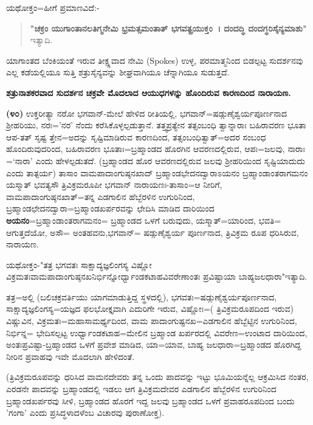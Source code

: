 ಯಥೋಕ್ತಂ=ಹೀಗೆ ಪ್ರಮಾಣವಿದೆ:-

\begin{verse}
\textbf{"ಚಕ್ರಂ ಯುಗಾಂತಾನಲತಿಗ್ಮನೇಮಿ ಭ್ರಮತ್ಸಮಂತಾತ್ ಭಗವತ್ಪ್ರಯುಕ್ತಂ~। ದಂದದ್ಧಿ ದಂದಗ್ಧರಿಸೈನ್ಯಮಾಶು"} ಇತ್ಯಾದಿ.
\end{verse}

\noindent
ಯಾಗಾಂತದ ಬೆಂಕಿಯಂತೆ ಇರುವ ತೀಕ್ಷ್ಣವಾದ ನೇಮಿ (Spokes) ಉಳ್ಳ, ಪರಮಾತ್ಮನಿಂದ ಬಿಡಲ್ಪಟ್ಟ ಸುದರ್ಶನವು ಎಲ್ಲ ಕಡೆಯಲ್ಲಿಯೂ ಸುತ್ತಿ ಶತ್ರುಸೈನ್ಯವನ್ನು ಶೀಘ್ರವಾಗಿಯೂ ಚೆನ್ನಾಗಿಯೂ ಸುಡುತ್ತದೆ.

\begin{center}
\textbf{ಶತ್ರುನಾಶಕರವಾದ ಸುದರ್ಶನ ಚಕ್ರವೇ ಮೊದಲಾದ ಆಯುಧಗಳನ್ನು ಹೊಂದಿರುವ ಕಾರಣದಿಂದ ನಾರಾಯಣ.}
\end{center}

\textbf{(೪೦)} ಉಕ್ತರೀತ್ಯಾ ನರೋ ಭಗವಾನ್-ಮೇಲೆ ಹೇಳಿದ ರೀತಿಯಲ್ಲಿ, ಭಗವಾನ್=\-ಷಡ್ಗುಣೈಶ್ವರ್ಯಪೂರ್ಣನಾದ ಶ‍್ರೀಹರಿಯು, ನರಃ='ನರ' ನೆಂದು ಕರೆಸಿಕೊಳ್ಳಲ್ಪಡುತ್ತಾನೆ. ತತ್ತ್ವಪ್ರತ್ಯೇನ ತತ್ಸಂಬಂಧಿ ತ್ವಾನ್ನಾರಾಃ ಬಹಿರಾವರಣ ಭೂತಾ ಆಪ-ತತ್ ಸೃಷ್ಟ ತ್ತೇನ=ಅದನ್ನು ಸೃಷ್ಟಿಮಾಡಿರುವ ಕಾರಣದಿಂದ, ತತ್ಸಂಬಂಧಿತ್ವಾತ್=ಅದರ ಸಂಬಂಧ ಹೊಂದಿರುವುದರಿಂದ, ಬಹಿರಾವರಣ ಭೂತಾಃ=ಬ್ರಹ್ಮಾಂಡದ ಹೊರಗಿನ ಆವರಣದಲ್ಲಿರುವ, ಆಪಃ=ಜಲವು, ನಾರಾಃ =`ನಾರಾ' ಎಂದು ಹೇಳಲ್ಪಡುತದೆ. (ಬ್ರಹ್ಮಾಂಡದ ಹೊರ ಆವರಣದಲ್ಲಿರುವ ಜಲವು ಶ‍್ರೀಹರಿಯಿಂದ ಸೃಷ್ಟಿಯಾದುದು ಎಂದು ತಾತ್ಪರ್ಯ) ತಾಸಾಂ ವಾಮಪಾದಾಂಗುಷ್ಠನಖಾದ್ ಬ್ರಹ್ಮಾಂಡಭೇದನದ್ವಾರಾಽಯನಂ ಬ್ರಹ್ಮಾಂಡಾಂತರಾಗಮನಂ ಯಸ್ಮಾತ್ ಭವತ್ಯಸೌ ತ್ರಿವಿಕ್ರಮರೂಪೀ ಭಗವಾನ್ ನಾರಾಯಣಃ-ತಾಸಾಂ=ಆ ನೀರಿಗೆ, ವಾಮಪಾದಾಂಗುಷ್ಠನಖಾತ್=ತನ್ನ ಎಡಗಾಲಿನ ಹೆಬ್ಬೆರಳಿನ ಉಗುರಿನಿಂದ, ಬ್ರಹ್ಮಾಂಡಛೇದನದ್ವಾರಾ=ಬ್ರಹ್ಮಾಂಡಖರ್ಪರವನ್ನು ಛೇದಿಸಿ ಮಾಡಿದ ದಾರಿಯಿಂದ \textbf{ಅಯನಂ}=ಬ್ರಹ್ಮಾಂಡಾಂತರಾಗಮನಂ= ಬ್ರಹ್ಮಾಂಡದ ಒಳಗೆ ಬರುವುದು, ಯಸ್ಮಾತ್=ಯಾರಿಂದ, ಭವತಿ= ಆಗುತ್ತದೆಯೋ, ಅಸೌ= ಅಂತಹವನು,\break ಭಗವಾನ್= ಷಡ್ಗುಣೈಶ್ವರ್ಯ ಪೂರ್ಣನಾದ, ತ್ರಿವಿಕ್ರಮ ರೂಪ ಧರಿಸಿರುವ, ನಾರಾಯಣ.

ಯಥೋಕ್ತಂ-"ತತ್ರ ಭಗವತಃ ಸಾಕ್ಷಾದ್ಯಜ್ಞಲಿಂಗಸ್ಯ ವಿಷ್ಣೋ ವಿಕ್ರಮತಃವಾಮಪಾದಾಂ\-ಗುಷ್ಠನಖನಿರ್ಭಿನ್ನೋರ್ಧ್ವಾಂಡಕಟಾಹವಿವರೇಣಾಂತಃ ಪ್ರವಿಷ್ಟಾಯಾ ಬಾಹ್ಯಜಲಧಾರಾ"\break ಇತ್ಯಾದಿ.

ತತ್ರ=ಅಲ್ಲಿ (ಬಲಿಚಕ್ರವರ್ತಿಯು ಯಾಗಮಾಡುತ್ತಿದ್ದ ಸ್ಥಳದಲ್ಲಿ), ಭಗವತಃ=ಷಡ್ಗುಣೈ\-ಶ್ವರ್ಯಪೂರ್ಣನಾದ, ಸಾಕ್ಷಾದ್ಯಜ್ಞಲಿಂಗಸ್ಯ=ಯಜ್ಞದ ಫಲಭೋಕ್ತೃವಾಗಿ ಎದುರಿಗೇ ಇರುವ, ವಿಷ್ಣೋಃ=( ತ್ರಿವಿಕ್ರಮರೂಪದಿಂದ ಇರುವ) ವಿಷ್ಣುವಿನ, ವಿಕ್ರಮತಃ=ಮಹಾಸಾಮರ್ಥ್ಯದಿಂದ, ವಾಮ ಪಾದಾಂಗುಷ್ಟನಖ=ಎಡಗಾಲಿನ ಹೆಬ್ಬೆಟ್ಟಿನ ಉಗುರಿನಿಂದ, ನಿರ್ಭಿನ್ನ= ಭೇದಿಸಲ್ಪಟ್ಟ ಉರ್ಧ್ವಾಂಡಕಟಾಹ=ಮೇಲಿನ ಬ್ರಹ್ಮಾಂಡ ಖರ್ಪರದಲ್ಲಿ ವಿವರೇಣ=ಉಂಟಾದ ದಾರಿಯಿಂದ, ಅಂತಃಪ್ರವಿಷ್ಟಾ-ಬ್ರಹ್ಮಾಂಡದ ಒಳಗೆ ಪ್ರವೇಶ ಮಾಡಿದ, ಯಾ=ಯಾವ, ಬಾಹ್ಯ ಜಲ\-ಧಾರಾ=ಬ್ರಹ್ಮಾಂಡದ ಹೊರಗಿದ್ದ ನೀರಿನ ಪ್ರವಾಹವು ಇವೇ ಮೊದಲಾಗಿ ಹೇಳಿದಂತೆ.

(ತ್ರಿವಿಕ್ರಮರೂಪವನ್ನು ಧರಿಸಿದ ವಾಮನದೇವರು ತನ್ನ ಒಂದು ಪಾದವನ್ನು ಇಟ್ಟು ಭೂಮಿಯನ್ನೆಲ್ಲ ಆಕ್ರಮಿಸಿದ ನಂತರ, ಎರಡನೇ ಪಾದವನ್ನು ಬ್ರಹ್ಮಾಂಡದಲ್ಲಿ ಇಡಲು ಆಗ ತ್ರಿವಿಕ್ರಮದೇವರ ಎಡಗಾಲಿನ ಹೆಬ್ಬೆರಳಿನ ಉಗುರಿನಿಂದ ಬ್ರಹ್ಮಾಂಡಖರ್ಪರವು ಸೀಳಿ, ಬ್ರಹ್ಮಾಂಡದ ಹೊರಗೆ ಇದ್ದ ಜಲವು ಬ್ರಹ್ಮಾಂಡದ ಒಳಗೆ ಪ್ರವಾಹರೂಪದಿಂದ ಬಂದು 'ಗಂಗಾ' ಎಂದು ಪ್ರಸಿದ್ಧಳಾದಳೆಂಬ ವಿಚಾರವು ಪುರಾಣೋಕ್ತ).

